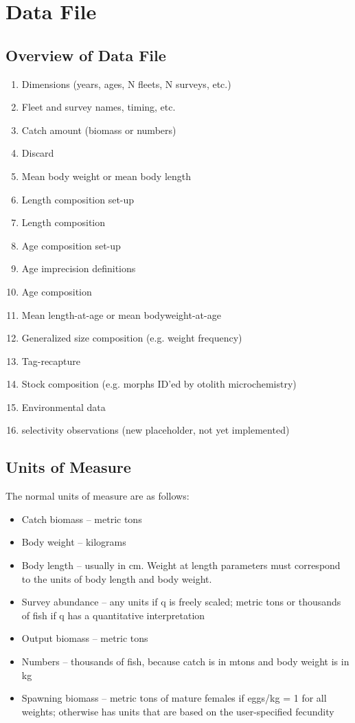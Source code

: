 \section{Data File}
\subsection{Overview of Data File}
	\begin{enumerate}
		\item Dimensions (years, ages, N fleets, N surveys, etc.)
		\item Fleet and survey names, timing, etc.
		\item Catch amount (biomass or numbers)
		\item Discard
		\item Mean body weight or mean body length
		\item Length composition set-up
		\item Length composition
		\item Age composition set-up
		\item Age imprecision definitions
		\item Age composition
		\item Mean length-at-age or mean bodyweight-at-age
		\item Generalized size composition (e.g. weight frequency)
		\item Tag-recapture
		\item Stock composition (e.g. morphs ID'ed by otolith microchemistry)
		\item Environmental data
		\item selectivity observations (new placeholder, not yet implemented)
	\end{enumerate}
	
\subsection{Units of Measure}
The normal units of measure are as follows:
\begin{itemize}
	\item Catch biomass -- metric tons	
	\item Body weight -- kilograms	
	\item Body length -- usually in cm. Weight at length parameters must correspond to the units of body length and body weight.	
	\item Survey abundance -- any units if q is freely scaled; metric tons or thousands of fish if q has a quantitative interpretation	
	\item Output biomass -- metric tons	
	\item Numbers -- thousands of fish, because catch is in mtons and body weight is in kg	
	\item Spawning biomass -- metric tons of mature females if eggs/kg = 1 for all weights; otherwise has units that are based on the user-specified fecundity	
\end{itemize}

